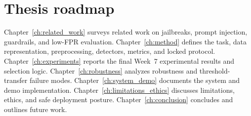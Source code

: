 \section{Thesis roadmap}

Chapter~\ref{ch:related_work} surveys related work on jailbreaks, prompt injection, guardrails, and low-FPR evaluation. Chapter~\ref{ch:method} defines the task, data representation, preprocessing, detectors, metrics, and locked protocol. Chapter~\ref{ch:experiments} reports the final Week~7 experimental results and selection logic. Chapter~\ref{ch:robustness} analyzes robustness and threshold-transfer failure modes. Chapter~\ref{ch:system_demo} documents the system and demo implementation. Chapter~\ref{ch:limitations_ethics} discusses limitations, ethics, and safe deployment posture. Chapter~\ref{ch:conclusion} concludes and outlines future work.

